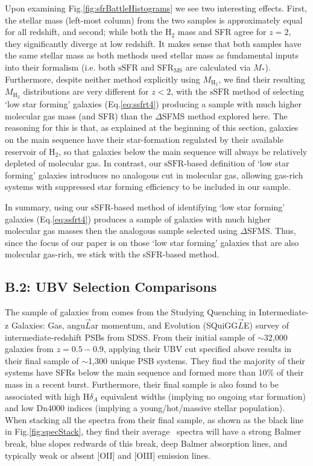 \documentclass[twocolumn, linenumbers]{aastex631}
\newcommand{\hh}{\text{H}_2}
\newcommand{\mhh}{M_{\text{H}_2}}
\newcommand{\ssfr}{\text{sSFR}}
\newcommand{\eq}{Eq.\hspace{.2em}}
\renewcommand{\fig}{Fig.\hspace{.2em}}
\begin{document}
Upon examining \fig\ref{fig:sfrBattleHistograms} we see two interesting effects.  First, the stellar mass (left-most column) from the two samples is approximately equal for all redshift, and second; while both the $\hh$ mass and SFR agree for $z=2$, they significantly diverge at low redshift.  It makes sense that both samples have the same stellar mass as both methods used stellar mass as fundamental inputs into their formalism (i.e. both $\ssfr$ and SFR$_{\text{MS}}$ are calculated via $M_*$).  Furthermore, despite neither method explicitly using $\mhh$, we find their resulting $\mhh$ distributions are very different for $z<2$, with the $\ssfr$ method of selecting `low star forming' galaxies (\eq\ref{eq:ssfrt4}) producing a sample with much higher molecular gas mass (and SFR) than the $\Delta$SFMS method explored here.  The reasoning for this is that, as explained at the beginning of this section, galaxies on the main sequence have their star-formation regulated by their available reservoir of $\hh$, so that galaxies below the main sequence will always be relatively depleted of molecular gas.  In contrast, our $\ssfr$-based definition of `low star forming' galaxies introduces no analogous cut in molecular gas, allowing gas-rich systems with suppressed star forming efficiency to be included in our sample.  

In summary, using our sSFR-based method of identifying `low star forming' galaxies (\eq\ref{eq:ssfrt4}) produces a sample of galaxies with much higher molecular gas masses then the analogous sample selected using $\Delta$SFMS.  Thus, since the focus of our paper is on those `low star forming' galaxies that are also molecular gas-rich, we stick with the sSFR-based method.

\subsection{B.2: UBV Selection Comparisons}
\label{app:ubv}


The sample of galaxies from \cite{suessSquiggle} comes from the Studying Quenching in Intermediate-z Galaxies: Gas, angu$\vec{L}$ar momentum, and Evolution (SQuiGG$\vec{L}$E) survey of intermediate-redshift PSBs from SDSS.  From their initial sample of $\sim$32,000 galaxies from $z=0.5-0.9$, applying their UBV cut specified above results in their final sample of $\sim$1,300 unique PSB systems.  They find the majority of their systems have SFRs below the main sequence and formed more than 10\% of their mass in a recent burst.  Furthermore, their final sample is also found to be associated with high H$\delta_A$ equivalent widths (implying no ongoing star formation) and low Dn4000 indices (implying a young/hot/massive stellar population).  When stacking all the spectra from their final sample, as shown as the black line in \fig \ref{fig:specStack}, they find their average \squig\ spectra will have a strong Balmer break, blue slopes redwards of this break, deep Balmer absorption lines, and typically weak or absent [OII] and [OIII] emission lines.
\newcommand{\squig}[0]{SQuiGG$\vec{L}$E}
\end{document}
